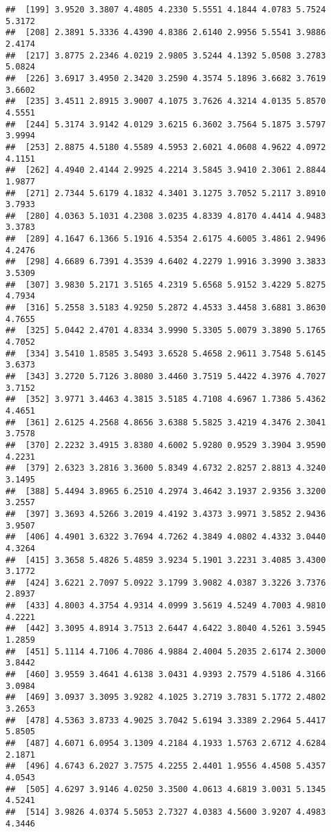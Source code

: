 \documentclass[12pt,a4paper]{scrartcl}\usepackage[]{graphicx}\usepackage[]{color}
\makeatletter
\newenvironment{kframe}{%
 \def\at@end@of@kframe{}%
 \ifinner\ifhmode%
  \def\at@end@of@kframe{\end{minipage}}%
  \begin{minipage}{\columnwidth}%
 \fi\fi%
 \def\FrameCommand##1{\hskip\@totalleftmargin \hskip-\fboxsep
 \colorbox{shadecolor}{##1}\hskip-\fboxsep
     \hskip-\linewidth \hskip-\@totalleftmargin \hskip\columnwidth}%
 \MakeFramed {\advance\hsize-\width
   \@totalleftmargin\z@ \linewidth\hsize
   \@setminipage}}%
 {\par\unskip\endMakeFramed%
 \at@end@of@kframe}
\newenvironment{knitrout}{}{} %
\makeatother
\begin{document}
\begin{Exercise}[difficulty=1, title={Understand the \texttt{<<-}}]
\begin{knitrout}
\begin{kframe}
\begin{verbatim}
##  [199] 3.9520 3.3807 4.4805 4.2330 5.5551 4.1844 4.0783 5.7524 5.3172
##  [208] 2.3891 5.3336 4.4390 4.8386 2.6140 2.9956 5.5541 3.9886 2.4174
##  [217] 3.8775 2.2346 4.0219 2.9805 3.5244 4.1392 5.0508 3.2783 5.0824
##  [226] 3.6917 3.4950 2.3420 3.2590 4.3574 5.1896 3.6682 3.7619 3.6602
##  [235] 3.4511 2.8915 3.9007 4.1075 3.7626 4.3214 4.0135 5.8570 4.5551
##  [244] 5.3174 3.9142 4.0129 3.6215 6.3602 3.7564 5.1875 3.5797 3.9994
##  [253] 2.8875 4.5180 4.5589 4.5953 2.6021 4.0608 4.9622 4.0972 4.1151
##  [262] 4.4940 2.4144 2.9925 4.2214 3.5845 3.9410 2.3061 2.8844 1.9877
##  [271] 2.7344 5.6179 4.1832 4.3401 3.1275 3.7052 5.2117 3.8910 3.7933
##  [280] 4.0363 5.1031 4.2308 3.0235 4.8339 4.8170 4.4414 4.9483 3.3783
##  [289] 4.1647 6.1366 5.1916 4.5354 2.6175 4.6005 3.4861 2.9496 4.2476
##  [298] 4.6689 6.7391 4.3539 4.6402 4.2279 1.9916 3.3990 3.3833 3.5309
##  [307] 3.9830 5.2171 3.5165 4.2319 5.6568 5.9152 3.4229 5.8275 4.7934
##  [316] 5.2558 3.5183 4.9250 5.2872 4.4533 3.4458 3.6881 3.8630 4.7655
##  [325] 5.0442 2.4701 4.8334 3.9990 5.3305 5.0079 3.3890 5.1765 4.7052
##  [334] 3.5410 1.8585 3.5493 3.6528 5.4658 2.9611 3.7548 5.6145 3.6373
##  [343] 3.2720 5.7126 3.8080 3.4460 3.7519 5.4422 4.3976 4.7027 3.7152
##  [352] 3.9771 3.4463 4.3815 3.5185 4.7108 4.6967 1.7386 5.4362 4.4651
##  [361] 2.6125 4.2568 4.8656 3.6388 5.5825 3.4219 4.3476 2.3041 3.7578
##  [370] 2.2232 3.4915 3.8380 4.6002 5.9280 0.9529 3.3904 3.9590 4.2231
##  [379] 2.6323 3.2816 3.3600 5.8349 4.6732 2.8257 2.8813 4.3240 3.1495
##  [388] 5.4494 3.8965 6.2510 4.2974 3.4642 3.1937 2.9356 3.3200 3.2557
##  [397] 3.3693 4.5266 3.2019 4.4192 3.4373 3.9971 3.5852 2.9436 3.9507
##  [406] 4.4901 3.6322 3.7694 4.7262 4.3849 4.0802 4.4332 3.0440 4.3264
##  [415] 3.3658 5.4826 5.4859 3.9234 5.1901 3.2231 3.4085 3.4300 3.1772
##  [424] 3.6221 2.7097 5.0922 3.1799 3.9082 4.0387 3.3226 3.7376 2.8937
##  [433] 4.8003 4.3754 4.9314 4.0999 3.5619 4.5249 4.7003 4.9810 4.2221
##  [442] 3.3095 4.8914 3.7513 2.6447 4.6422 3.8040 4.5261 3.5945 1.2859
##  [451] 5.1114 4.7106 4.7086 4.9884 2.4004 5.2035 2.6174 2.3000 3.8442
##  [460] 3.9559 3.4641 4.6138 3.0431 4.9393 2.7579 4.5186 4.3166 3.0984
##  [469] 3.0937 3.3095 3.9282 4.1025 3.2719 3.7831 5.1772 2.4802 3.2653
##  [478] 4.5363 3.8733 4.9025 3.7042 5.6194 3.3389 2.2964 5.4417 5.8505
##  [487] 4.6071 6.0954 3.1309 4.2184 4.1933 1.5763 2.6712 4.6284 2.1871
##  [496] 4.6743 6.2027 3.7575 4.2255 2.4401 1.9556 4.4508 5.4357 4.0543
##  [505] 4.6297 3.9146 4.0250 3.3500 4.0613 4.6819 3.0031 5.1345 4.5241
##  [514] 3.9826 4.0374 5.5053 2.7327 4.0383 4.5600 3.9207 4.4983 4.3446

\end{verbatim}
\end{kframe}
\end{knitrout}
\end{Exercise}
\end{document}
